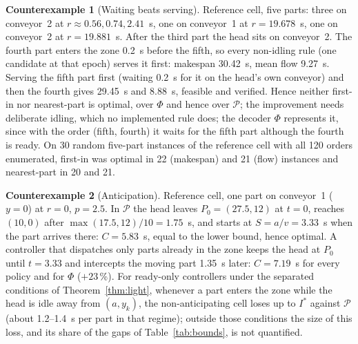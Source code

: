 \documentclass[11pt,a4paper]{article}
\theoremstyle{plain}
\theoremstyle{definition}
\newtheorem{counterexample}{Counterexample}
\theoremstyle{remark}
\newcommand{\Pb}{\mathcal{P}}
\begin{document}
\begin{counterexample}[Waiting beats serving]\label{cex:wait}
Reference cell, five parts: three on conveyor~2 at $r\approx0.56,0.74,2.41$~s, one on
conveyor~1 at $r=19.678$~s, one on conveyor~2 at $r=19.881$~s. After the third part the
head sits on conveyor~2. The fourth part enters the zone 0.2~s before the fifth, so every
non-idling rule (one candidate at that epoch) serves it first: makespan 30.42~s, mean flow
9.27~s. Serving the fifth part first (waiting 0.2~s for it on the head's own conveyor) and
then the fourth gives 29.45~s and 8.88~s, feasible and verified. Hence neither first-in nor
nearest-part is optimal, over $\Phi$ and hence over $\Pb$; the improvement needs
deliberate idling, which no implemented rule does; the decoder $\Phi$ represents it,
since with the order (fifth, fourth) it waits for the fifth part although the fourth is
ready. On 30 random five-part instances of
the reference cell with all 120 orders enumerated, first-in was optimal in 22 (makespan)
and 21 (flow) instances and nearest-part in 20 and 21.
\end{counterexample}

\begin{counterexample}[Anticipation]\label{cex:anticipation}
Reference cell, one part on conveyor~1 ($y=0$) at $r=0$, $p=2.5$. In $\Pb$ the head leaves
$P_0=(27.5,12)$ at $t=0$, reaches $(10,0)$ after $\max(17.5,12)/10=1.75$~s, and starts at
$S=a/v=3.33$~s when the part arrives there: $C=5.83$~s, equal to the lower bound, hence
optimal. A controller that dispatches only parts already in the zone keeps the head at
$P_0$ until $t=3.33$ and intercepts the moving part 1.35~s later: $C=7.19$~s for every
policy and for $\Phi$ ($+23$\,\%). For ready-only controllers under the separated
conditions of Theorem~\ref{thm:light}, whenever a part enters the zone while the head is
idle away from $(a,y_k)$, the non-anticipating cell loses up to $I^\ast$ against $\Pb$
(about 1.2--1.4~s per part in that regime); outside those conditions the size of this
loss, and its share of the gaps of Table~\ref{tab:bounds}, is not quantified.
\end{counterexample}
\end{document}
